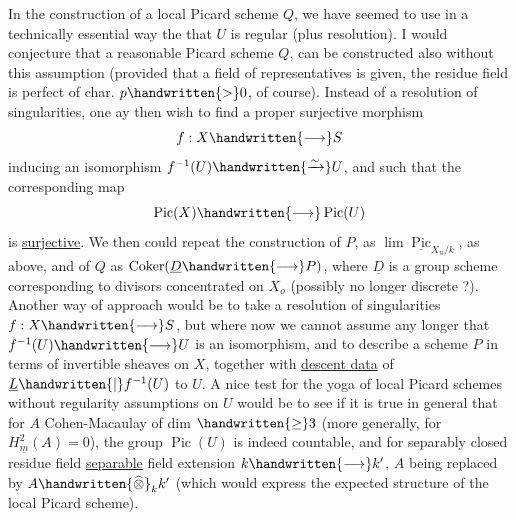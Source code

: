 In the construction of a local Picard scheme $Q$, we have seemed to use in a technically essential way the   that $U$ is regular (plus resolution). I would conjecture that a reasonable  Picard scheme $Q$,  can be constructed also without this assumption (provided that a field of representatives is given,  the residue field is perfect of char. $p\handwritten{>}0$, of course). Instead of a resolution of singularities, one ay then wish to find a proper surjective morphism
\[
f:X\handwritten{\longrightarrow}S
\]
inducing an isomorphism $f^{-1}(U)\handwritten{\xrightarrow{\sim}}U$, and such that the corresponding map
\[
\operatorname{Pic}(X)\handwritten{\longrightarrow}\operatorname{Pic}(U)
\]
is \uline{surjective}. We then could repeat the construction of $P$, as $\lim\underline{\operatorname{Pic}}_{X_n/k}$, as above, and of $Q$ as $\operatorname{Coker}(\underline{D}\handwritten{\longrightarrow}P)$, where $\underline{D}$ is a group scheme corresponding to divisors concentrated on $X_o$ (possibly no longer discrete ?). Another way of approach would be to take a resolution of singularities $f:X\handwritten{\longrightarrow}S$, but where now we cannot assume any longer that $f^{-1}(U)\handwritten{\longrightarrow}U$ is an isomorphism, and to describe a scheme $P$ in terms of invertible sheaves on $X$, together with \uline{descent data} of $\underline{L}\handwritten{|}f^{-1}(U)$ to $U$. A nice test for the yoga of local Picard schemes without regularity assumptions on $U$ would be to see if it is true in general that for $A$ Cohen-Macaulay of dim $\handwritten{\geq}3$ (more generally, for $H^2_{\underline{m}}(A)=0$), the group $\operatorname{Pic}(U)$ is indeed countable, and for separably closed residue field   \uline{separable} field extension $k\handwritten{\longrightarrow}k'$, $A$ being replaced by $A\handwritten{\widehat{\otimes}}_k k'$ (which would express the expected  structure of the local Picard scheme).
